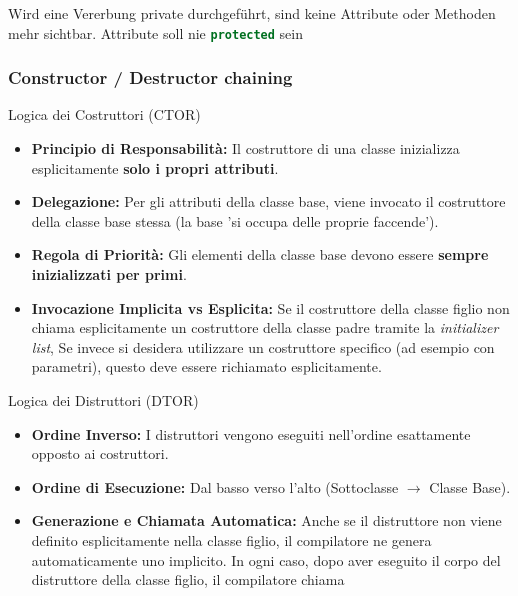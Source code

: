 \resizebox{\columnwidth}{!}{  
    
}

Wird eine Vererbung private durchgeführt, sind keine Attribute oder Methoden mehr sichtbar. Attribute soll nie \lstinline[language=C++]|protected| sein
\subsubsection{Constructor / Destructor chaining}

\par{Logica dei Costruttori (CTOR)}
\begin{itemize}
    \item \textbf{Principio di Responsabilità:} Il costruttore di una classe inizializza esplicitamente \textbf{solo i propri attributi}.
    \item \textbf{Delegazione:} Per gli attributi della classe base, viene invocato il costruttore della classe base stessa (la base 'si occupa delle proprie faccende').
    \item \textbf{Regola di Priorità:} Gli elementi della classe base devono essere \textbf{sempre inizializzati per primi}.
    \item \textbf{Invocazione Implicita vs Esplicita:} Se il costruttore della classe 
    figlio non chiama esplicitamente un costruttore della classe padre tramite la 
    \textit{initializer list},  Se invece si desidera utilizzare un costruttore specifico (ad esempio con parametri), questo deve essere richiamato esplicitamente.
\end{itemize}

\columnbreak



\par{Logica dei Distruttori (DTOR)}
\begin{itemize}
    \item \textbf{Ordine Inverso:} I distruttori vengono eseguiti nell'ordine esattamente opposto ai costruttori.
    \item \textbf{Ordine di Esecuzione:} Dal basso verso l'alto (Sottoclasse $\rightarrow$ Classe Base).
    \item \textbf{Generazione e Chiamata Automatica:} Anche se il distruttore non viene 
    definito esplicitamente nella classe figlio, il compilatore ne genera automaticamente 
    uno implicito. In ogni caso, dopo aver eseguito il corpo del distruttore della classe 
    figlio, il compilatore chiama 
\end{itemize}

